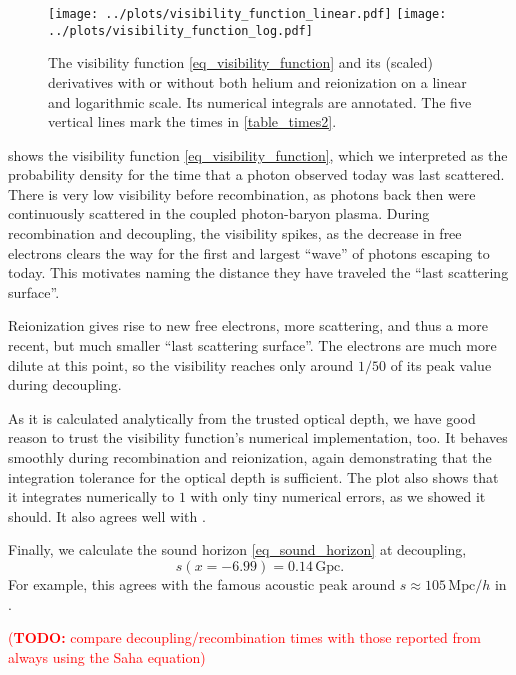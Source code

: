 \documentclass[10pt,a4paper]{article}
\newcommand\TODO[1]{\textcolor{red}{(\textbf{TODO:} #1)}}
\begin{document}
\begin{figure}[t]
	\centering
	\texttt{[image: ../plots/visibility\_function\_linear.pdf]}
	\texttt{[image: ../plots/visibility\_function\_log.pdf]}
	\caption{
		The visibility function \eqref{eq_visibility_function} and its (scaled) derivatives with or without both helium and reionization on a linear and logarithmic scale.
		Its numerical integrals are annotated.
		The five vertical lines mark the times in \cref{table_times2}.
	}
	\label{fig_visibility_function}
\end{figure}

 shows the visibility function \eqref{eq_visibility_function},
which we interpreted as the probability density for the time that a photon observed today was last scattered.
There is very low visibility before recombination, as photons back then were continuously scattered in the coupled photon-baryon plasma.
During recombination and decoupling, the visibility spikes, as the decrease in free electrons clears the way for the first and largest ``wave'' of photons escaping to today.
This motivates naming the distance they have traveled the ``last scattering surface''.

Reionization gives rise to new free electrons, more scattering, and thus a more recent, but much smaller ``last scattering surface''.
The electrons are much more dilute at this point, so the visibility reaches only around $1/50$ of its peak value during decoupling.

As it is calculated analytically from the trusted optical depth, we have good reason to trust the visibility function's numerical implementation, too.
It behaves smoothly during recombination and reionization, again demonstrating that the integration tolerance for the optical depth is sufficient.
The plot also shows that it integrates numerically to $1$ with only tiny numerical errors, as we showed it should.
It also agrees well with \cite[\textsc{fig. 3}]{callinHowCalculateCMB2006}.

Finally, we calculate the sound horizon \eqref{eq_sound_horizon} at decoupling,
\begin{equation}
	s(x=-6.99) = 0.14\,\mathrm{Gpc}.
\end{equation}
For example, this agrees with the famous acoustic peak around $s \approx 105\,\mathrm{Mpc}/h$ in \cite[\textsc{Fig. 2}]{eisensteinDetectionBaryonAcoustic2005}.

\TODO{compare decoupling/recombination times with those reported from always using the Saha equation}
\end{document}
